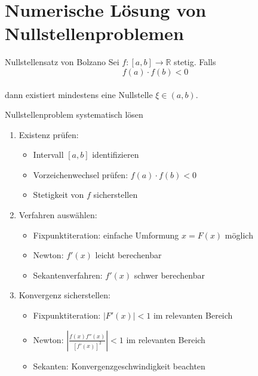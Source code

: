 \section{Numerische Lösung von Nullstellenproblemen}

\begin{lemma}{Nullstellensatz von Bolzano}
Sei $f:[a,b] \rightarrow \mathbb{R}$ stetig. Falls 
\vspace{-1mm}\\
$$f(a) \cdot f(b) < 0$$ 
\vspace{-3mm}\\
dann existiert mindestens eine Nullstelle $\xi \in (a,b)$.
\end{lemma}



\begin{KR}{Nullstellenproblem systematisch lösen}
\begin{enumerate}
    \item Existenz prüfen:
    \begin{itemize}
        \item Intervall $[a,b]$ identifizieren
        \item Vorzeichenwechsel prüfen: $f(a) \cdot f(b) < 0$ 
        \item Stetigkeit von $f$ sicherstellen
    \end{itemize}
    
    \item Verfahren auswählen:
    \begin{itemize}
        \item Fixpunktiteration: einfache Umformung $x = F(x)$ möglich
        \item Newton: $f'(x)$ leicht berechenbar
        \item Sekantenverfahren: $f'(x)$ schwer berechenbar
    \end{itemize}
    
    \item Konvergenz sicherstellen:
    \begin{itemize}
        \item Fixpunktiteration: $|F'(x)| < 1$ im relevanten Bereich
        \item Newton: $|\frac{f(x)f''(x)}{[f'(x)]^2}| < 1$ im relevanten Bereich
        \item Sekanten: Konvergenzgeschwindigkeit beachten
    \end{itemize}


\end{enumerate}
\end{KR}
